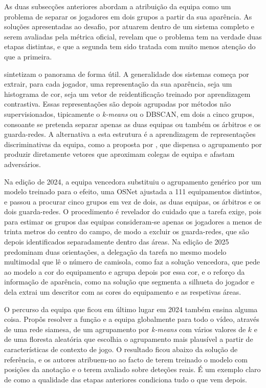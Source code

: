 As duas subsecções anteriores abordam a atribuição da equipa como um problema de separar os
jogadores em dois grupos a partir da sua aparência. As soluções apresentadas ao desafio, por
atuarem dentro de um sistema completo e serem avaliadas pela métrica oficial, revelam que o
problema tem na verdade duas etapas distintas, e que a segunda tem sido tratada com muito
menos atenção do que a primeira.

\citet{golovkin2025minimap} sintetizam o panorama de forma útil. A generalidade dos sistemas
começa por extrair, para cada jogador, uma representação da sua aparência, seja um histograma
de cor, seja um vetor de reidentificação treinado por aprendizagem contrastiva. Essas
representações são depois agrupadas por métodos não supervisionados, tipicamente o
\emph{k-means} ou o DBSCAN, em dois a cinco grupos, consoante se pretenda separar apenas as
duas equipas ou também os árbitros e os guarda-redes. A alternativa a esta estrutura é a
aprendizagem de representações discriminativas da equipa, como a proposta por
\citet{istasse2019associative}, que dispensa o agrupamento por produzir diretamente vetores
que aproximam colegas de equipa e afastam adversários.

Na edição de 2024, a equipa vencedora substituiu o agrupamento genérico por um modelo
treinado para o efeito, uma OSNet ajustada a 111 equipamentos distintos, e passou a procurar
cinco grupos em vez de dois, as duas equipas, os árbitros e os dois guarda-redes. O
procedimento é revelador do cuidado que a tarefa exige, pois para estimar os grupos das
equipas consideram-se apenas os jogadores a menos de trinta metros do centro do campo, de
modo a excluir os guarda-redes, que são depois identificados separadamente dentro das áreas.
Na edição de 2025 predominam duas orientações, a delegação da tarefa no mesmo modelo
multimodal que lê o número de camisola, como faz a solução vencedora, que pede ao modelo a
cor do equipamento e agrupa depois por essa cor, e o reforço da informação de aparência,
como na solução que segmenta a silhueta do jogador e dela extrai um descritor com as cores do
equipamento e as respetivas áreas.

O percurso da equipa que ficou em último lugar em 2024 também ensina alguma coisa.
Propôs resolver a função e a equipa globalmente para todo o vídeo, através de uma rede
siamesa, de um agrupamento por \emph{k-means} com vários valores de $k$ e de uma floresta
aleatória que escolhia o agrupamento mais plausível a partir de características de contexto
de jogo. O resultado ficou abaixo da solução de referência, e os autores atribuem-no ao facto
de terem treinado o modelo com posições da anotação e o terem avaliado sobre deteções reais.
É um exemplo claro de como a qualidade das etapas anteriores condiciona tudo o que vem
depois.

